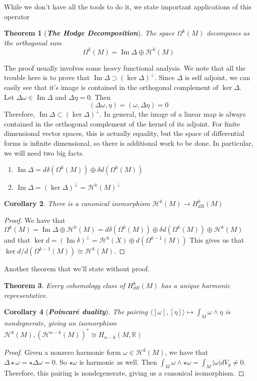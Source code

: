 \documentclass[psamsfonts]{amsart}
\newtheorem{thm}{Theorem}[section]
\newtheorem{cor}[thm]{Corollary}
\theoremstyle{definition}
\theoremstyle{remark}
\newcommand{\R}{\mathbb{R}}
\newcommand{\ib}[1]{\textbf{\textit{#1}}}
\DeclareMathOperator{\im}{Im}
\begin{document}
While we don't have all the tools to do it, we state important applications of this operator
\begin{thm}[\ib{The Hodge Decomposition}]
The space $\Omega^k(M)$ decomposes as the orthogonal sum
$$\Omega^k(M) = \im \Delta \oplus \mathcal{H}^k(M) $$
\end{thm}
The proof usually involves some heavy functional analysis. We note that all the trouble here is to prove that $\im \Delta \supset (\ker\Delta)^\perp$. Since $\Delta$ is self adjoint, we can easily see that it's image is contained in the orthogonal complement of $\ker \Delta$. Let $\Delta \omega \in \im \Delta$ and $\Delta \eta = 0$. Then
$$(\Delta\omega, \eta) = (\omega,\Delta\eta) = 0 $$
Therefore, $\im\Delta \subset (\ker\Delta)^\perp$. In general, the image of a linear map is always contained in the orthogonal complement of the kernel of its adjoint. For finite dimensional vector spaces, this is actually equality, but the space of differential forms is infinite dimensional, so there is additional work to be done. In particular, we will need two big facts.
\begin{enumerate}
\item $\im \Delta = d\delta(\Omega^k(M)) \oplus \delta d(\Omega^k(M))$
\item $\im \Delta = (\ker\Delta)^\perp = \mathcal{H}^k(M)^\perp$
\end{enumerate} 
\begin{cor}
There is a canonical isomorphism $\mathcal{H}^k(M) \to H^k_{dR}(M)$
\end{cor}
\begin{proof}
We have that $\Omega^k(M) = \im\Delta \oplus \mathcal{H}^k(M) = d\delta(\Omega^k(M)) \oplus \delta d(\Omega^k(M)) \oplus \mathcal{H}^k(M)$ and that $\ker d = (\im \delta)^\perp = \mathcal{H}^k(X) \oplus d(\Omega^{k-1}(M))$ This gives us that $\ker d / d(\Omega^{k-1}(M)) \cong \mathcal{H}^k(M)$.
\end{proof}
Another theorem that we'll state without proof.
\begin{thm}
Every cohomology class of $H^k_{dR}(M)$ has a unique harmonic representative.
\end{thm}
\begin{cor}[\ib{Poincar\'e duality}]
The pairing $\langle [\omega], [\eta]\rangle \mapsto \int_M \omega \wedge \eta$ is nondegnerate, giving an isomorphism $\mathcal{H}^k(M), (\mathcal{H}^{n-k}(M))^* \cong H_{n-k}(M, \R)$
\end{cor}
\begin{proof}
Given a nonzero harmonic form $\omega \in \mathcal{H}^k(M)$, we have that $\Delta\star\omega = \star\Delta\omega = 0$. So $\star\omega$ is harmonic as well. Then $\int_M \omega\wedge\star\omega = \int_M|\omega|dV_g \neq 0$. Therefore, this pairing is nondegenerate, giving us a canonical isomorphism.
\end{proof}
%
\end{document}
